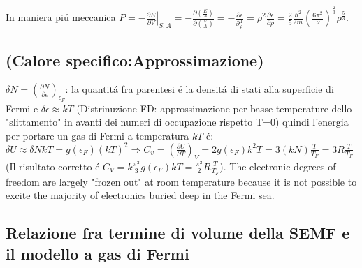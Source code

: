 \documentclass[main.tex]{subfiles}
\begin{document}
In maniera pi\'u meccanica $P=-\left.\frac{\partial E}{\partial V} \right|_{S,A}=-\frac{\partial (\frac{E}{A})}{\partial (\frac{V}{A})}=-\frac{\partial \epsilon}{\partial \frac{1}{\rho}}=\rho^2 \frac{\partial \epsilon}{\partial \rho}=\frac{2}{5}\frac{\hbar^2}{2m}(\frac{6\pi^2}{\nu})^{\frac{2}{3}}\rho^\frac{5}{3}$.

\subsection{(Calore specifico:Approssimazione)}
$\delta N=(\frac{\partial N}{\partial \epsilon})_{\epsilon_F}$: la quantit\'a fra parentesi \'e la densit\'a di stati alla superficie di Fermi e $\delta \epsilon \approx kT$ (Distrinuzione FD: approssimazione per basse temperature dello "slittamento" in avanti dei numeri di occupazione rispetto T=0) quindi l'energia per portare un gas di Fermi a temperatura $kT$ \'e: $\delta U\approx \delta NkT=g(\epsilon_F)(kT)^2 \Rightarrow C_v=(\frac{\partial U}{\partial T})_V=2g(\epsilon_F)k^2T=3(kN)\frac{T}{T_F}=3R\frac{T}{T_F}$ (Il risultato corretto \'e $C_V=k\frac{\pi^2}{3}g(\epsilon_F)kT=\frac{\pi^2}{2}R\frac{T}{T_F}$). 
The electronic degrees of freedom are largely "frozen out" at room temperature because it is not possible to excite the majority of electronics buried deep in the Fermi sea.

\subsection{Relazione fra termine di volume della SEMF e il modello a gas di Fermi}
\end{document}
